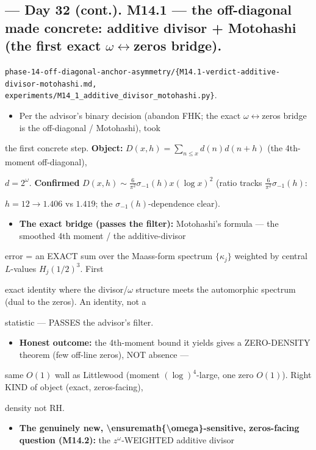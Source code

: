 \documentclass[10pt]{article}
\begin{document}
\subsection*{ --- Day 32 (cont.). M14.1 --- the off-diagonal made concrete: additive divisor + Motohashi (the first exact \ensuremath{\omega}\ensuremath{\leftrightarrow}zeros bridge).}
\texttt{phase-14-off-diagonal-anchor-asymmetry/\{M14.1-verdict-additive-divisor-motohashi.md, experiments/M14\_1\_additive\_divisor\_motohashi.py\}}.\par
\begin{itemize}
\item Per the advisor's binary decision (abandon FHK; the exact \ensuremath{\omega}\ensuremath{\leftrightarrow}zeros bridge is the off-diagonal / Motohashi), took
\end{itemize}
  the first concrete step. \textbf{Object:} $D(x,h)=\sum_{n\le x}d(n)d(n+h)$ (the 4th-moment off-diagonal),\par
  $d=2^\omega$. \textbf{Confirmed} $D(x,h)\sim\tfrac6{\pi^2}\sigma_{-1}(h)x(\log x)^2$ (ratio tracks $\tfrac6{\pi^2}\sigma_{-1}(h)$:\par
  $h{=}12\to1.406$ vs $1.419$; the $\sigma_{-1}(h)$-dependence clear).\par
\begin{itemize}
\item \textbf{The exact bridge (passes the filter):} Motohashi's formula --- the smoothed 4th moment / the additive-divisor
\end{itemize}
  error = an EXACT sum over the Maass-form spectrum $\{\kappa_j\}$ weighted by central $L$-values $H_j(1/2)^3$. First\par
  exact identity where the divisor/\ensuremath{\omega} structure meets the automorphic spectrum (dual to the zeros). An identity, not a\par
  statistic --- PASSES the advisor's filter.\par
\begin{itemize}
\item \textbf{Honest outcome:} the 4th-moment bound it yields gives a ZERO-DENSITY theorem (few off-line zeros), NOT absence ---
\end{itemize}
  same $O(1)$ wall as Littlewood (moment $(\log)^4$-large, one zero $O(1)$). Right KIND of object (exact, zeros-facing),\par
  density not RH.\par
\begin{itemize}
\item \textbf{The genuinely new, \textbackslash{}ensuremath\{\textbackslash{}omega\}-sensitive, zeros-facing question (M14.2):} the $z^\omega$-WEIGHTED additive divisor
\end{itemize}
\end{document}
